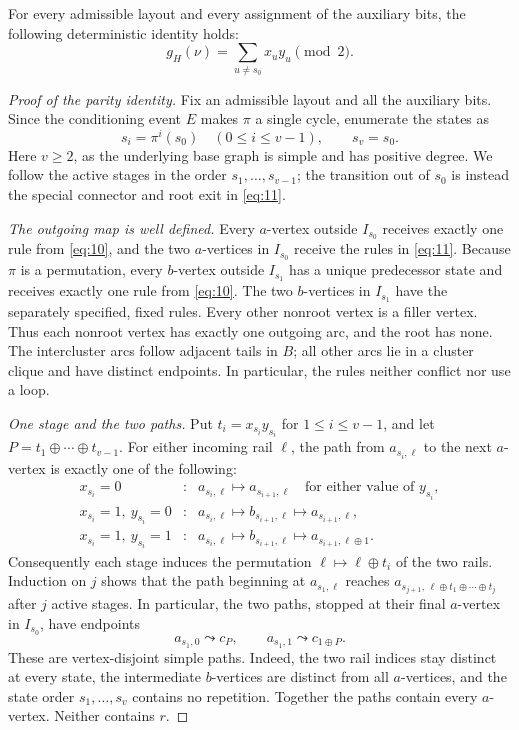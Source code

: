 \documentclass[11pt]{article}
\theoremstyle{definition}
\theoremstyle{remark}
\numberwithin{equation}{section}
\begin{document}
For every admissible layout and every assignment of the auxiliary
bits, the following deterministic identity holds:
\begin{equation}\label{eq:12}
g_H(\nu)=\sum_{u\ne s_0}x_u y_u\pmod2.
\end{equation}
\begin{proof}[Proof of the parity identity]
Fix an admissible layout and all the auxiliary bits. Since the
conditioning event \(E\) makes \(\pi\) a single cycle, enumerate the
states as
\[
 s_i=\pi^i(s_0)\quad(0\le i\le v-1),\qquad s_v=s_0.
\]
Here \(v\ge2\), as the underlying base graph is simple and has
positive degree. We follow the active stages in the order
\(s_1,\ldots,s_{v-1}\); the transition out of \(s_0\) is instead
the special connector and root exit in \eqref{eq:11}.

\emph{The outgoing map is well defined.}
Every \(a\)-vertex outside \(I_{s_0}\) receives exactly one rule
from \eqref{eq:10}, and the two \(a\)-vertices in \(I_{s_0}\) receive
the rules in \eqref{eq:11}. Because \(\pi\) is a permutation, every
\(b\)-vertex outside \(I_{s_1}\) has a unique predecessor state
and receives exactly one rule from \eqref{eq:10}. The two \(b\)-vertices
in \(I_{s_1}\) have the separately specified, fixed rules.
Every other nonroot vertex is a filler vertex. Thus each nonroot
vertex has exactly one outgoing arc, and the root has none.
The intercluster arcs follow adjacent tails in \(B\); all other
arcs lie in a cluster clique and have distinct endpoints.
In particular, the rules neither conflict nor use a loop.

\emph{One stage and the two paths.}
Put \(t_i=x_{s_i}y_{s_i}\) for \(1\le i\le v-1\), and let
\(P=t_1\oplus\cdots\oplus t_{v-1}\).
For either incoming rail \(\ell\), the path from
\(a_{s_i,\ell}\) to the next \(a\)-vertex is exactly one of
the following:
\[
\begin{array}{ccl}
x_{s_i}=0 &:&
 a_{s_i,\ell}\longmapsto a_{s_{i+1},\ell}
 \quad\text{for either value of }y_{s_i},\\[2pt]
x_{s_i}=1,\ y_{s_i}=0 &:&
 a_{s_i,\ell}\longmapsto b_{s_{i+1},\ell}
 \longmapsto a_{s_{i+1},\ell},\\[2pt]
x_{s_i}=1,\ y_{s_i}=1 &:&
 a_{s_i,\ell}\longmapsto b_{s_{i+1},\ell}
 \longmapsto a_{s_{i+1},\ell\oplus1}.
\end{array}
\]
Consequently each stage induces the permutation
\(\ell\mapsto\ell\oplus t_i\) of the two rails.
Induction on \(j\) shows that the path beginning at
\(a_{s_1,\ell}\) reaches
\(a_{s_{j+1},\,\ell\oplus t_1\oplus\cdots\oplus t_j}\)
after \(j\) active stages. In particular, the two paths,
stopped at their final \(a\)-vertex in \(I_{s_0}\), have endpoints
\[
 a_{s_1,0}\leadsto c_P,\qquad
 a_{s_1,1}\leadsto c_{1\oplus P}.
\]
These are vertex-disjoint simple paths. Indeed, the two rail
indices stay distinct at every state, the intermediate
\(b\)-vertices are distinct from all \(a\)-vertices, and the state
order \(s_1,\ldots,s_v\) contains no repetition. Together the paths
contain every \(a\)-vertex. Neither contains \(r\).


\end{proof}
\end{document}

